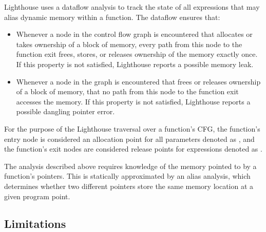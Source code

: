 Lighthouse uses a dataflow analysis to track the state of all expressions that
may alias dynamic memory within a function.
%
The dataflow ensures that:
%
\begin{itemize}
%
\item Whenever a node in the control flow graph is encountered that allocates
or takes ownership of a block of memory, every path from this node to the
function exit frees, stores, or releases ownership of the memory exactly once.  
%
If this property is not satisfied, Lighthouse reports a possible memory leak.
%
\item Whenever a node in the graph is encountered that frees or releases
ownership of a block of memory, that no path from this node to the function
exit accesses the memory.  
%
If this property is not satisfied, Lighthouse reports a possible dangling
pointer error.
%
\end{itemize}
%
For the purpose of the Lighthouse traversal over a function's CFG, the
function's entry node is considered an allocation point for all
 parameters denoted as , and the function's exit
nodes are considered release points for  expressions denoted as
.



The analysis described above requires knowledge of the memory pointed to by
a function's pointers.  
%
This is statically approximated by an alias analysis, which determines
whether two different pointers store the same memory location at a given
program point.  



\subsection{Limitations}



